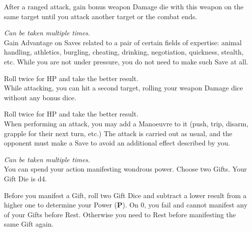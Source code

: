 \documentclass[itdr]{subfiles}
\begin{document}
\vfill
{}
After a ranged attack, gain bonus weapon Damage die with this weapon on the same target until you attack another target or the combat ends.

\vfill
{} {\slshape Can be taken multiple times.}\\
Gain Advantage on Saves related to a pair of certain fields of expertise: animal handling, athletics, burgling, cheating, drinking, negotiation, quickness, stealth, etc. While you are not under pressure, you do not need to make such Save at all.

\break

 Roll twice for HP and take the better result.\\
While attacking, you can hit a second target, rolling your weapon Damage dice without any bonus dice.

\vfill
{}
 Roll twice for HP and take the better result.\\
When performing an attack, you may add a Manoeuvre to it (push, trip, disarm, grapple for their next turn, etc.) The attack is carried out as usual, and the opponent must make a Save to avoid an additional effect described by you.

\vfill
{}
 {\slshape Can be taken multiple times.}\\
You can spend your action manifesting wondrous power. Choose two Gifts. Your Gift Die is d4.

Before you manifest a Gift, roll two Gift Dice and subtract a lower result from a higher one to determine your Power (\textbf{P}). On 0, you fail and cannot manifest any of your Gifts before Rest. Otherwise you need to Rest before manifesting the same Gift again.
\end{document}
